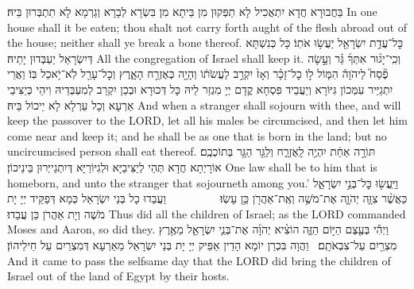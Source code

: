 {{בַּחֲבוּרָא חֲדָא יִתְאֲכִיל לָא תַפְּקוּן מִן בֵּיתָא מִן בִּשְׂרָא לְבָרָא וְגַרְמָא לָא תִתְבְּרוּן בֵּיהּ׃}
{In one house shall it be eaten; thou shalt not carry forth aught of the flesh abroad out of the house; neither shall ye break a bone thereof.}{}
{כׇּל־עֲדַ֥ת יִשְׂרָאֵ֖ל יַעֲשׂ֥וּ אֹתֽוֹ׃
}
{כָּל כְּנִשְׁתָּא דְּיִשְׂרָאֵל יַעְבְּדוּן יָתֵיהּ׃}
{All the congregation of Israel shall keep it.}{}
{וְכִֽי־יָג֨וּר אִתְּךָ֜ גֵּ֗ר וְעָ֣שָׂה פֶ֘סַח֮ לַיהֹוָה֒ הִמּ֧וֹל ל֣וֹ כׇל־זָכָ֗ר וְאָז֙ יִקְרַ֣ב לַעֲשֹׂת֔וֹ וְהָיָ֖ה כְּאֶזְרַ֣ח הָאָ֑רֶץ וְכׇל־עָרֵ֖ל לֹֽא־יֹ֥אכַל בּֽוֹ׃
}
{וַאֲרֵי יִתְגַיַּיר עִמְּכוֹן גִּיּוֹרָא וְיַעֲבֵיד פִּסְחָא קֳדָם יְיָ מִגְזַר לֵיהּ כָּל דְּכוּרָא וּבְכֵן יִקְרַב לְמִעְבְּדֵיהּ וִיהֵי כְּיַצִּיבֵי אַרְעָא וְכָל עַרְלָא לָא יֵיכוֹל בֵּיהּ׃}
{And when a stranger shall sojourn with thee, and will keep the passover to the LORD, let all his males be circumcised, and then let him come near and keep it; and he shall be as one that is born in the land; but no uncircumcised person shall eat thereof.}{}
{תּוֹרָ֣ה אַחַ֔ת יִהְיֶ֖ה לָֽאֶזְרָ֑ח וְלַגֵּ֖ר הַגָּ֥ר בְּתוֹכְכֶֽם׃
}
{אוֹרָיְתָא חֲדָא תְּהֵי לְיַצִּיבַיָּא וּלְגִיּוֹרַיָּא דְּיִתְגַייְּרוּן בֵּינֵיכוֹן׃}
{One law shall be to him that is homeborn, and unto the stranger that sojourneth among you.’}{}
{וַיַּֽעֲשׂ֖וּ כׇּל־בְּנֵ֣י יִשְׂרָאֵ֑ל כַּאֲשֶׁ֨ר צִוָּ֧ה יְהֹוָ֛ה אֶת־מֹשֶׁ֥ה וְאֶֽת־אַהֲרֹ֖ן כֵּ֥ן עָשֽׂוּ׃ \setuma         }
{וַעֲבַדוּ כָל בְּנֵי יִשְׂרָאֵל כְּמָא דְּפַקֵּיד יְיָ יָת מֹשֶׁה וְיָת אַהֲרֹן כֵּן עֲבַדוּ׃}
{Thus did all the children of Israel; as the LORD commanded Moses and Aaron, so did they.}{}
{וַיְהִ֕י בְּעֶ֖צֶם הַיּ֣וֹם הַזֶּ֑ה הוֹצִ֨יא יְהֹוָ֜ה אֶת־בְּנֵ֧י יִשְׂרָאֵ֛ל מֵאֶ֥רֶץ מִצְרַ֖יִם עַל־צִבְאֹתָֽם׃ \petucha }
{וַהֲוָה בִּכְרַן יוֹמָא הָדֵין אַפֵּיק יְיָ יָת בְּנֵי יִשְׂרָאֵל מֵאַרְעָא דְּמִצְרַיִם עַל חֵילֵיהוֹן׃}
{And it came to pass the selfsame day that the LORD did bring the children of Israel out of the land of Egypt by their hosts.}{}
}
